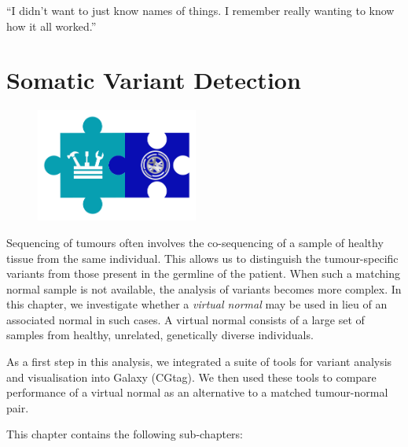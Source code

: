\cleartorightpage
\begin{savequote}[75mm]
“I didn’t want to just know names of things. I remember really wanting to know how it all worked.”
\end{savequote}

\chapter{Somatic Variant Detection}\label{chapter:virtualnormal}
\setcounter{figure}{-1}
\setcounter{table}{-1}
\setcounter{section}{-1}

\begin{figure}[t!]
\includegraphics[height=10em]{frontmatter/images/chapter-header-variants-tools.png}
\end{figure}
\setcounter{figure}{-1}
\setcounter{table}{-1}
\setcounter{section}{-1}


Sequencing of tumours often involves the co-sequencing of a sample of healthy tissue from the same individual. This allows us to distinguish the tumour-specific variants from those present in the germline of the patient. When such a matching normal sample is not available, the analysis of variants becomes more complex. In this chapter, we investigate whether a \emph{virtual normal} may be used in lieu of an associated normal in such cases. A virtual normal consists of a large set of samples from healthy, unrelated, genetically diverse individuals.

As a first step in this analysis, we integrated a suite of tools for variant analysis and visualisation into Galaxy (CGtag). We then used these tools to compare performance of a virtual normal as an alternative to a matched tumour-normal pair.

This chapter contains the following sub-chapters:

